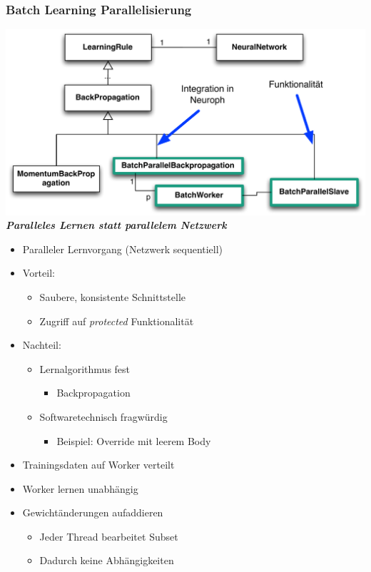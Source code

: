 \documentclass[18pt]{beamer}
\begin{document}
	\begin{frame}[c,allowframebreaks]\frametitle{Batch Learning Parallelisierung}

		\includegraphics[scale=0.58]{Grafiken/Batchparallel_uml.pdf}
		\\
		\textbf{\textit{Paralleles Lernen statt parallelem Netzwerk}}
	\framebreak

		\begin{itemize}
			\item Paralleler Lernvorgang (Netzwerk sequentiell)
			\item Vorteil:
			\begin{itemize}
				\item Saubere, konsistente Schnittstelle
				\item Zugriff auf \textit{protected} Funktionalität
			\end{itemize}
			\item Nachteil: 
			\begin{itemize}
				\item Lernalgorithmus fest 
				\begin{itemize}
					\item Backpropagation
				\end{itemize}
				\item Softwaretechnisch fragwürdig
				\begin{itemize}
					\item Beispiel: Override mit leerem Body
				\end{itemize}
			\end{itemize}
		\end{itemize}


	\framebreak

		\begin{itemize}
			\item Trainingsdaten auf Worker verteilt
			\item Worker lernen unabhängig
			\item Gewichtänderungen aufaddieren
			\begin{itemize}
				\item Jeder Thread bearbeitet Subset
				\item Dadurch keine Abhängigkeiten
			\end{itemize}
		\end{itemize}


\end{frame}
\end{document}
